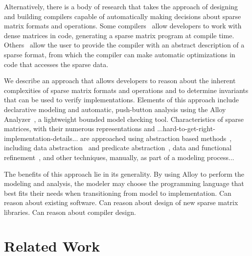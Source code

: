 \documentclass[11pt,conference]{IEEEtran}
\begin{document}
Alternatively, there is a body of research that takes the approach of designing and building compilers capable of automatically making decisions about sparse matrix formats and operations.  Some compilers~\cite{bik1995, bik1996} allow developers to work with dense matrices in code, generating a sparse matrix program at compile time.  Others~\cite{kotlyar1997} allow the user to provide the compiler with an abstract description of a sparse format, from which the compiler can make automatic optimizations in code that accesses the sparse data.

We describe an approach that allows developers to reason about the inherent complexities of sparse matrix formats and operations and to determine invariants that can be used to verify implementations.
Elements of this approach include declarative modeling and automatic, push-button analysis using the Alloy Analyzer~\cite{jackson2012}, a lightweight bounded model checking tool.  Characteristics of sparse matrices, with their numerous representations and ...hard-to-get-right-implementation-details... are approached using abstraction based methods~\cite{clarke1994}, including data abstraction~\cite{dingel1995} and predicate abstraction~\cite{graf1997}, data and functional refinement~\cite{woodcock1996}, and other techniques, manually, as part of a modeling process...

The benefits of this approach lie in its generality.  By using Alloy to perform the modeling and analysis, the modeler may choose the programming language that best fits their needs when transitioning from model to implementation.
Can reason about existing software.
Can reason about design of new sparse matrix libraries.
Can reason about compiler design.

\section{Related Work}
\end{document}
